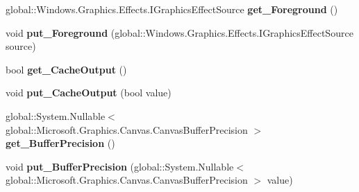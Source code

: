 \begin{DoxyCompactItemize}
\item 
\mbox{\label{class_microsoft_1_1_graphics_1_1_canvas_1_1_effects_1_1_blend_effect_a10ccecae64e09d405b1921dc72bcd69d}} 
global\+::\+Windows.\+Graphics.\+Effects.\+I\+Graphics\+Effect\+Source {\bfseries get\+\_\+\+Foreground} ()
\item 
\mbox{\label{class_microsoft_1_1_graphics_1_1_canvas_1_1_effects_1_1_blend_effect_a898a9aa44604170ad7f898b4cc45c084}} 
void {\bfseries put\+\_\+\+Foreground} (global\+::\+Windows.\+Graphics.\+Effects.\+I\+Graphics\+Effect\+Source source)
\item 
\mbox{\label{class_microsoft_1_1_graphics_1_1_canvas_1_1_effects_1_1_blend_effect_a5277510deb8dcc175e62db9fab054126}} 
bool {\bfseries get\+\_\+\+Cache\+Output} ()
\item 
\mbox{\label{class_microsoft_1_1_graphics_1_1_canvas_1_1_effects_1_1_blend_effect_abf6fc226936245b186bd77eb7281c6ed}} 
void {\bfseries put\+\_\+\+Cache\+Output} (bool value)
\item 
\mbox{\label{class_microsoft_1_1_graphics_1_1_canvas_1_1_effects_1_1_blend_effect_a77470fdd2f3361cf0ef9ed3c79ffb8b8}} 
global\+::\+System.\+Nullable$<$ global\+::\+Microsoft.\+Graphics.\+Canvas.\+Canvas\+Buffer\+Precision $>$ {\bfseries get\+\_\+\+Buffer\+Precision} ()
\item 
\mbox{\label{class_microsoft_1_1_graphics_1_1_canvas_1_1_effects_1_1_blend_effect_a3eeb0529f739eebd077cbf5b93e8ebd0}} 
void {\bfseries put\+\_\+\+Buffer\+Precision} (global\+::\+System.\+Nullable$<$ global\+::\+Microsoft.\+Graphics.\+Canvas.\+Canvas\+Buffer\+Precision $>$ value)
\item 
\mbox{\label{class_microsoft_1_1_graphics_1_1_canvas_1_1_effects_1_1_blend_effect_a5ab40e1ce6749b638dc61d204220d00f}} 

\end{DoxyCompactItemize}
